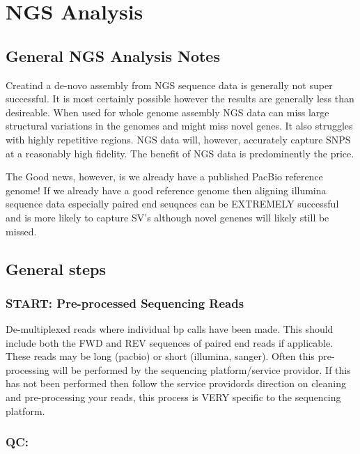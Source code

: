 \documentclass{article}
\begin{document}
    \newpage
    \section{NGS Analysis}
    \subsection{General NGS Analysis Notes}
    Creatind a de-novo assembly from NGS sequence data is generally not super successful.  It is most certainly possible however the results are generally less than desireable.  When used for whole genome assembly NGS data can miss large structural variations in the genomes and might miss novel genes.    It also struggles with highly repetitive regions.  NGS data will, however, accurately capture SNPS at a reasonably high fidelity.    The benefit of NGS data is predominently the price.

    The Good news, however, is we already have a published PacBio reference genome!   If we already have a good reference genome then aligning illumina sequence data especially paired end seuqnces can be EXTREMELY successful and is more likely to capture SV's although novel genenes will likely still be missed.

    \subsection{General steps}
    \subsubsection{\textbf{START:} Pre-processed Sequencing Reads}
    
    De-multiplexed reads where individual bp calls have been made. This should include both the FWD and REV sequences of paired end reads if applicable.  These reads may be long (pacbio) or short (illumina, sanger).  Often this pre-processing will be performed by the sequencing platform/service providor.  If this has not been performed then follow the service providords direction on cleaning and pre-processing your reads, this process is VERY specific to the sequencing platform.

    
    \subsubsection{\textbf{QC:}}
    
\end{document}

